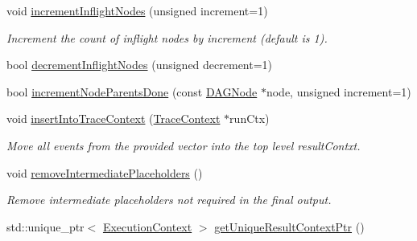 \begin{DoxyCompactItemize}
\item 
\mbox{\label{classglow_1_1runtime_1_1_execution_state_ac5c4a4207fa388ea36566796990f5c48}} 
void \hyperlink{classglow_1_1runtime_1_1_execution_state_ac5c4a4207fa388ea36566796990f5c48}{increment\+Inflight\+Nodes} (unsigned increment=1)
\begin{DoxyCompactList}\small\item\em Increment the count of inflight nodes by {\ttfamily increment} (default is 1). \end{DoxyCompactList}\item 
bool \hyperlink{classglow_1_1runtime_1_1_execution_state_aecb0acd57723284fe11b39e34886bd90}{decrement\+Inflight\+Nodes} (unsigned decrement=1)
\item 
bool \hyperlink{classglow_1_1runtime_1_1_execution_state_af80493d05caab1bf6a0a936269382828}{increment\+Node\+Parents\+Done} (const \hyperlink{structglow_1_1runtime_1_1_d_a_g_node}{D\+A\+G\+Node} $\ast$node, unsigned increment=1)
\item 
\mbox{\label{classglow_1_1runtime_1_1_execution_state_a78bd840454e363b65944aa23c24ccf4e}} 
void \hyperlink{classglow_1_1runtime_1_1_execution_state_a78bd840454e363b65944aa23c24ccf4e}{insert\+Into\+Trace\+Context} (\hyperlink{classglow_1_1_trace_context}{Trace\+Context} $\ast$run\+Ctx)
\begin{DoxyCompactList}\small\item\em Move all events from the provided vector into the top level result\+Contxt. \end{DoxyCompactList}\item 
\mbox{\label{classglow_1_1runtime_1_1_execution_state_aeb7b674123b0d2eda2e82ff090a528ac}} 
void \hyperlink{classglow_1_1runtime_1_1_execution_state_aeb7b674123b0d2eda2e82ff090a528ac}{remove\+Intermediate\+Placeholders} ()
\begin{DoxyCompactList}\small\item\em Remove intermediate placeholders not required in the final output. \end{DoxyCompactList}\item 
std\+::unique\+\_\+ptr$<$ \hyperlink{classglow_1_1_execution_context}{Execution\+Context} $>$ \hyperlink{classglow_1_1runtime_1_1_execution_state_afb39fb7b89ae3fe9ad5f869349c5f130}{get\+Unique\+Result\+Context\+Ptr} ()

\end{DoxyCompactItemize}
